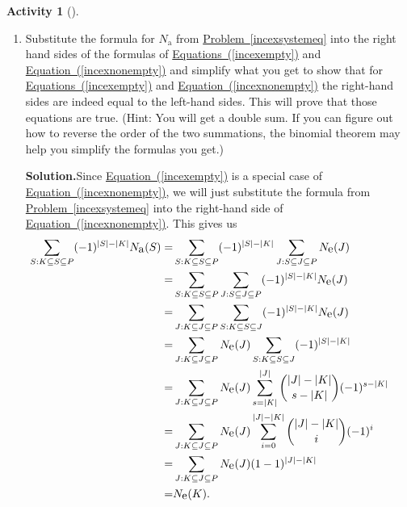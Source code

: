\documentclass[10pt,]{book}
\theoremstyle{plain}
\theoremstyle{definition}
\newtheorem{activity}[project]{Activity}
\numberwithin{equation}{chapter}
\newcommand{\amp}{&}
\begin{document}
\begin{activity}[]\label{activity-216}
~\par
\begin{enumerate}[label=(\alph*)]
 \item Substitute the formula for \(N_{\mbox{a} }\) from \hyperref[incexsystemeq]{Problem~\ref{incexsystemeq}} into the right hand sides of the formulas of \hyperref[incexempty]{Equations~(\ref{incexempty})} and \hyperref[incexnonempty]{Equation~(\ref{incexnonempty})} and simplify what you get to show that for \hyperref[incexempty]{Equations~(\ref{incexempty})} and \hyperref[incexnonempty]{Equation~(\ref{incexnonempty})} the right-hand sides are indeed equal to the left-hand sides. This will prove that those equations are true. (Hint: You will get a double sum. If you can figure out how to reverse the order of the two summations, the binomial theorem may help you simplify the formulas you get.)%
\par\medskip\noindent%
\textbf{Solution.}\quad Since \hyperref[incexempty]{Equation~(\ref{incexempty})} is a special case of \hyperref[incexnonempty]{Equation~(\ref{incexnonempty})}, we will just substitute the formula from \hyperref[incexsystemeq]{Problem~\ref{incexsystemeq}} into the right-hand side of \hyperref[incexnonempty]{Equation~(\ref{incexnonempty})}. This gives us%
\begin{align*}
\hspace{-.25 in}\sum_{S: K\subseteq S\subseteq P}
(-1)^{|S|-|K|}N_{\mbox{a} }(S) =\amp \sum_{S: K\subseteq S\subseteq P}
(-1)^{|S|-|K|}\sum_{J: S\subseteq
J\subseteq P}N_{\mbox{e} }(J)\\
=\amp \sum_{S: K\subseteq S\subseteq P}
\sum_{J: S\subseteq
J\subseteq P}(-1)^{|S|-|K|}N_{\mbox{e} }(J)\\
=\amp \sum_{J:K\subseteq J\subseteq P}\sum_{S:K\subseteq S\subseteq J}
(-1)^{|S|-|K|}N_{\mbox{e} }(J)\\
=\amp \sum_{J:K\subseteq J\subseteq P}N_{\mbox{e} }(J)\sum_{S:K\subseteq
S\subseteq J} (-1)^{|S|-|K|}\\
=\amp \sum_{J:K\subseteq J\subseteq P}N_{\mbox{e} }(J)\sum_{s=|K|}^{|J|}
\binom{|J|-|K|
}{s-|K|}(-1)^{s-|K|}\\
=\amp \sum_{J:K\subseteq J\subseteq P}N_{\mbox{e} }(J)\sum_{i=0}^{|J|-|K|}
\binom{|J|-|K|
}{i}(-1)^{i}\\
=\amp \sum_{J:K\subseteq J\subseteq
P}N_{\mbox{e} }(J)(1-1)^{|J|-|K|}\\
=\amp N_{\mbox{e} }(K).
\end{align*}

\end{enumerate}
\end{activity}
\end{document}
